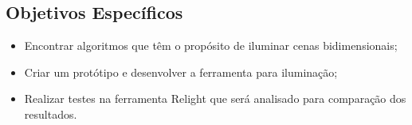 
\subsection{Objetivos Específicos}
\begin{itemize}
	\item Encontrar algoritmos que têm o propósito de iluminar cenas bidimensionais;
	\item Criar um protótipo e desenvolver a ferramenta para iluminação;
	\item Realizar testes na ferramenta Relight que será analisado para comparação dos resultados.
\end{itemize}